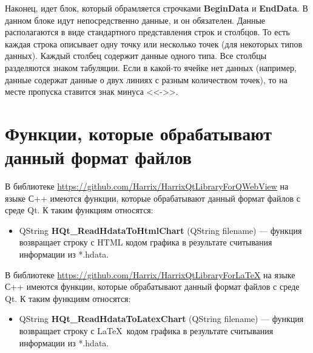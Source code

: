 \documentclass[a4paper,12pt]{article}
\begin{document}
Наконец, идет блок, который обрамляется строчками \textbf{BeginData} и \textbf{EndData}. В данном блоке идут непосредственно данные, и он обязателен. Данные располагаются в виде стандартного представления строк и столбцов. То есть каждая строка описывает одну точку или несколько точек (для некоторых типов данных). Каждый столбец содержит данные одного типа. Все столбцы разделяются знаком табуляции. Если в какой-то ячейке нет данных (например, данные содержат данные о двух линиях с разным количеством точек), то на месте пропуска ставится знак минуса <<->>.

\section{Функции, которые обрабатывают данный формат файлов}

В библиотеке \href {https://github.com/Harrix/HarrixQtLibraryForQWebView} {https://github.com/Harrix/HarrixQtLibraryForQWebView} на языке С++ имеются функции, которые обрабатывают данный формат файлов с среде Qt. К таким функциям относятся:

\begin{itemize}
\item QString \textbf{HQt\_ReadHdataToHtmlChart} (QString filename) --- функция возвращает строку с HTML кодом графика в результате считывания информации из *.hdata.
\end{itemize}

В библиотеке \href {https://github.com/Harrix/HarrixQtLibraryForLaTeX} {https://github.com/Harrix/HarrixQtLibraryForLaTeX} на языке С++ имеются функции, которые обрабатывают данный формат файлов с среде Qt. К таким функциям относятся:

\begin{itemize}
\item QString \textbf{HQt\_ReadHdataToLatexChart} (QString filename) --- функция возвращает строку с \LaTeX \ кодом графика в результате считывания информации из *.hdata.
\end{itemize}
\end{document}
